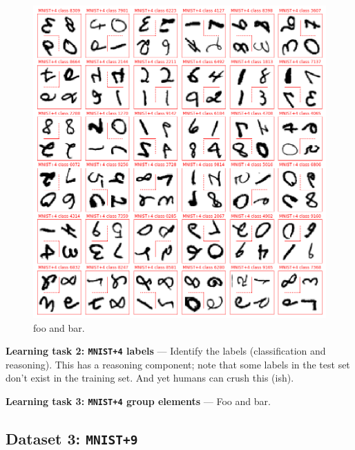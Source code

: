 \documentclass{article}
\renewcommand{\paragraph}[1]{\par\medskip\noindent\textbf{#1} ---}
\begin{document}
\begin{figure}[t!]
\includegraphics[width=\textwidth]{../notebooks/MNIST+4.png}
\caption{foo and bar.\label{fig:4}}
\end{figure}

\paragraph{Learning task 2: \texttt{MNIST+4} labels}
Identify the labels (classification and reasoning).
This has a reasoning component; note that some labels in the test set don't exist in the training set.
And yet humans can crush this (ish).

\paragraph{Learning task 3: \texttt{MNIST+4} group elements}
Foo and bar.

\subsection*{Dataset 3: \texttt{MNIST+9}}
\end{document}
